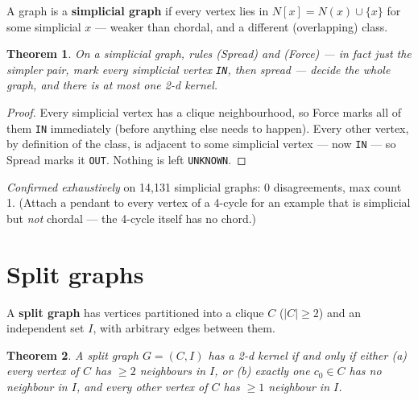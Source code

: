 \documentclass[11pt]{article}
\theoremstyle{plain}
\newtheorem{theorem}{Theorem}
\theoremstyle{definition}
\theoremstyle{remark}
\begin{document}
A graph is a \textbf{simplicial graph} if every vertex lies in $N[x]=N(x)\cup\{x\}$
for some simplicial $x$ — weaker than chordal, and a different (overlapping) class.

\begin{theorem}
On a simplicial graph, rules (Spread) and (Force) — in fact just the simpler pair,
mark every simplicial vertex \texttt{IN}, then spread — decide the whole graph, and
there is at most one 2-d kernel.
\end{theorem}

\begin{proof}
Every simplicial vertex has a clique neighbourhood, so Force marks all of them
\texttt{IN} immediately (before anything else needs to happen). Every other vertex,
by definition of the class, is adjacent to some simplicial vertex — now \texttt{IN}
— so Spread marks it \texttt{OUT}. Nothing is left \texttt{UNKNOWN}.
\end{proof}

\emph{Confirmed exhaustively} on 14{,}131 simplicial graphs: 0 disagreements, max
count 1. (Attach a pendant to every vertex of a 4-cycle for an example that is
simplicial but \emph{not} chordal — the 4-cycle itself has no chord.)

\section{Split graphs}

A \textbf{split graph} has vertices partitioned into a clique $C$ ($|C|\ge2$) and an
independent set $I$, with arbitrary edges between them.

\begin{theorem}
A split graph $G=(C,I)$ has a 2-d kernel if and only if either
\textup{(a)} every vertex of $C$ has $\ge2$ neighbours in $I$, or
\textup{(b)} exactly one $c_0\in C$ has \emph{no} neighbour in $I$, and every other
vertex of $C$ has $\ge1$ neighbour in $I$.
\end{theorem}
\end{document}
